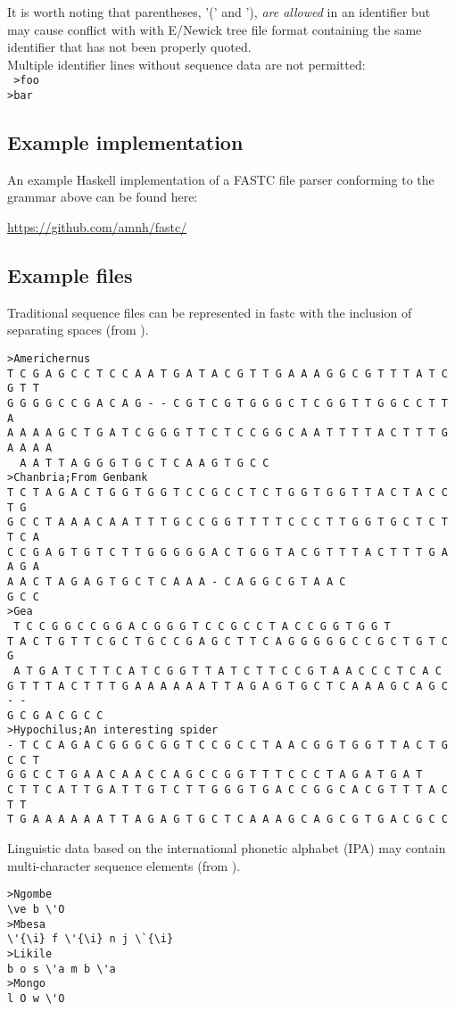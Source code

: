 \documentclass[12pt]{article}
\begin{document}
It is worth noting that parentheses, '(' and '), \textit{are allowed} in an identifier but may cause conflict with with E/Newick tree file format \citep{Cardonaetal2008} containing the same identifier that has not been properly quoted. \\

Multiple identifier lines without sequence data  are not permitted:\\
\texttt{	
>foo\\
>bar\\
}

\subsection{Example implementation}

An example Haskell implementation of a FASTC file parser conforming to the grammar above can be found here:

\url{https://github.com/amnh/fastc/}


\subsection{Example files}
Traditional sequence files can be represented in fastc with the inclusion of separating spaces (from \citealp{Wheeler1998c}).
\singlespace
\begin{verbatim}
>Americhernus      
T C G A G C C T C C A A T G A T A C G T T G A A A G G C G T T T A T C G T T 
G G G G C C G A C A G - - C G T C G T G G G C T C G G T T G G C C T T A 
A A A A G C T G A T C G G G T T C T C C G G C A A T T T T A C T T T G A A A A
  A A T T A G G G T G C T C A A G T G C C 
>Chanbria;From Genbank
T C T A G A C T G G T G G T C C G C C T C T G G T G G T T A C T A C C T G 
G C C T A A A C A A T T T G C C G G T T T T C C C T T G G T G C T C T T C A 
C C G A G T G T C T T G G G G G A C T G G T A C G T T T A C T T T G A A G A 
A A C T A G A G T G C T C A A A - C A G G C G T A A C
G C C 
>Gea
 T C C G G C C G G A C G G G T C C G C C T A C C G G T G G T 
T A C T G T T C G C T G C C G A G C T T C A G G G G G C C G C T G T C G 
 A T G A T C T T C A T C G G T T A T C T T C C G T A A C C C T C A C 
G T T T A C T T T G A A A A A A T T A G A G T G C T C A A A G C A G C - -
G C G A C G C C 
>Hypochilus;An interesting spider
- T C C A G A C G G G C G G T C C G C C T A A C G G T G G T T A C T G C C T 
G G C C T G A A C A A C C A G C C G G T T T C C C T A G A T G A T 
C T T C A T T G A T T G T C T T G G G T G A C C G G C A C G T T T A C T T
T G A A A A A A T T A G A G T G C T C A A A G C A G C G T G A C G C C 
 \end{verbatim}
 \doublespace
Linguistic data based on the international phonetic alphabet (IPA) may contain multi-character sequence elements
(from \citealp{Whiteleyetal2019}).
\singlespace
\begin{verbatim}
>Ngombe
\ve b \'O
>Mbesa
\'{\i} f \'{\i} n j \`{\i}
>Likile
b o s \'a m b \'a
>Mongo
l O w \'O
\end{verbatim}
\end{document}
